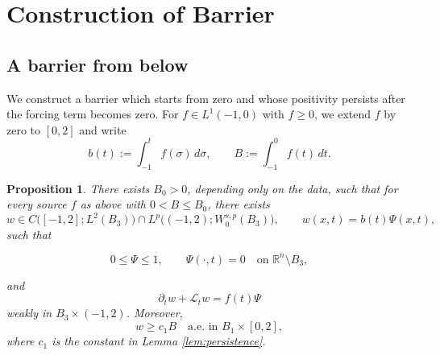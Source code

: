 \documentclass[10pt]{amsart}
\theoremstyle{plain}
\newtheorem{proposition}[lemma]{Proposition}
\theoremstyle{definition}
\theoremstyle{remark}
\numberwithin{equation}{section}
\newcommand{\R}{\mathbb R}
\begin{document}
\section{Construction of Barrier}

\subsection{A barrier from below}
We construct a barrier which starts from zero and whose positivity persists after the forcing term 
becomes zero.
For $f\in L^1(-1,0)$ with $f\ge0$, we extend $f$ by zero to $[0,2]$
and write
\begin{equation}\label{eq:b-def}
b(t):=\int_{-1}^t f(\sigma)\,d\sigma,
\qquad B:=\int_{-1}^0f(t)\,dt.
\end{equation}

\begin{proposition}\label{prop:bump}
There exists $B_0>0$, depending only on the data, such that for every
source $f$ as above with $0<B\le B_0$, there exists
\[
w\in C\bigl([-1,2];L^2(B_3)\bigr)
\cap L^p\bigl((-1,2);W^{s,p}_0(B_3)\bigr),
\qquad
w(x,t)=b(t)\Psi(x,t),
\]
such that

\[
    0\le\Psi\le1,
    \qquad
    \Psi(\cdot,t)=0
    \quad\text{on }\R^n\setminus B_3,
\]

and
\begin{equation}\label{eq:w-eq}
\partial_tw+\mathcal{L}_tw=f(t)\Psi
\end{equation}
weakly in $B_3\times(-1,2)$. Moreover,
\begin{equation}\label{eq:w-lower}
w\ge c_1B
\quad\text{a.e. in }B_1\times[0,2],
\end{equation}
where $c_1$ is the constant in Lemma \ref{lem:persistence}.
\end{proposition}
\end{document}
